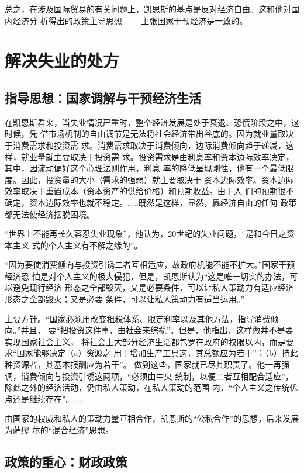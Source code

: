 总之，在涉及国际贸易的有关问题上，凯恩斯的基点是反对经济自由。这和他对国内经济分
析得出的政策主导思想—— 主张国家干预经济是一致的。

\section{解决失业的处方}

\subsection{指导思想：国家调解与干预经济生活}

在凯恩斯看来，当失业情况严重时，整个经济发展是处于衰退、恐慌阶段之中，这时候，凭
借市场机制的自由调节是无法将社会经济带出谷底的。因为就业量取决于消费需求和投资需
求。消费需求取决于消费倾向，边际消费倾向趋于递减，这样，就业量就主要取决于投资需
求。投资需求是由利息率和资本边际效率决定，其中，因流动偏好这个心理法则作用，利息
率的降低呈现刚性，他有一个最低限度。因此，投资量的大小（需求的强弱）就主要取决于
资本边际效率。资本边际效率取决于重置成本（资本资产的供给价格）和预期收益。由于人
们的预期很不确定，资本边际效率也就不稳定。……既然是这样，显然，靠经济自由的任何
政策都无法使经济摆脱困境。

“世界上不能再长久容忍失业现象”，他认为，20世纪的失业问题，“是和今日之资本主义
式的个人主义有不解之缘的”。

“因为要使消费倾向与投资引诱二者互相适应，故政府机能不能不扩大。”国家干预经济恐
怕是对个人主义的极大侵犯，但是，凯恩斯认为“这是唯一切实的办法，可以避免现行经济
形态之全部毁灭，又是必要条件，可以让私人策动力有适应经济形态之全部毁灭；又是必要
条件，可以让私人策动力有适当运用。”

主要方针。“国家必须用改变租税体系、限定利率以及其他方法，指导消费倾向。”并且，
要“把投资这件事，由社会来综揽”。但是，他指出，这样做并不是要实现国家社会主义，
将社会上大部分经济生活都包罗在政府的权限以内，而是要求“国家能够决定（a）资源之
用于增加生产工具这，其总额应为若干”；（b）持此种资源者，其基本报酬应为若干”。
做到这些，国家就已尽其职责了。他一再强调，消费倾向与投资引诱这两项，“必须由中央
统制，以便二者互相配合适应”，除此之外的经济活动，仍由私人策动，在私人策动的范围
内，“个人主义之传统优点还是继续存在”。……

由国家的权威和私人的策动力量互相合作，凯恩斯的“公私合作”的思想，后来发展为萨缪
尔的“混合经济”思想。

\subsection{政策的重心：财政政策}

